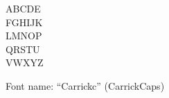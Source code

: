 \documentclass[a4paper]{article}
\begin{document}
\begin{center}
\fontsize{60pt}{72pt}
  ABCDE \\
  FGHIJK \\
  LMNOP \\
  QRSTU \\
  VWXYZ \\
\end{center}
\vfill
\begin{center}
Font name: ``Carrickc'' (CarrickCaps)
\end{center}
\end{document}
